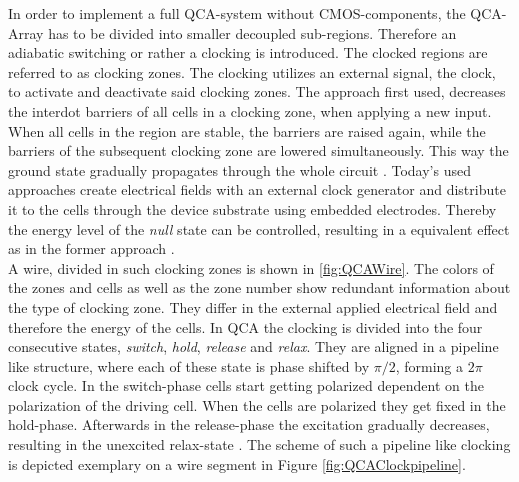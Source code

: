 In order to implement a full QCA-system without CMOS-components, the QCA-Array has to be divided into smaller decoupled sub-regions. Therefore an adiabatic switching or rather a clocking is introduced. The clocked regions are referred to as clocking zones. The clocking utilizes an external signal, the clock, to activate and deactivate said clocking zones. The approach first used, decreases the interdot barriers of all cells in a clocking zone, when applying a new input. When all cells in the region are stable, the barriers are raised again, while the barriers of the subsequent clocking zone are lowered simultaneously. This way the ground state gradually propagates through the whole circuit \cite{lent1997device}. Today's used approaches create electrical fields with an external clock generator and distribute it to the cells through the device substrate using embedded electrodes. Thereby the energy level of the \textit{null} state can be controlled, resulting in a equivalent effect as in the former approach \cite{Walter}.\\

A wire, divided in such clocking zones is shown in \ref{fig:QCAWire}. The colors of the zones and cells as well as the zone number show redundant information about the type of clocking zone. They differ in the external applied electrical field and therefore the energy of the cells. In QCA the clocking is divided into the four consecutive states, \textit{switch}, \textit{hold}, \textit{release} and \textit{relax}. They are aligned in a pipeline like structure, where each of these state is phase shifted by $\pi/2$, forming a $2\pi$ clock cycle. In the switch-phase cells start getting polarized dependent on the polarization of the driving cell. When the cells are polarized they get fixed in the hold-phase. Afterwards in the release-phase the excitation gradually decreases, resulting in the unexcited relax-state \cite{Sasamal2020QuantumDotCA}. The scheme of such a pipeline like clocking is depicted exemplary on a wire segment in Figure \ref{fig:QCAClockpipeline}.


